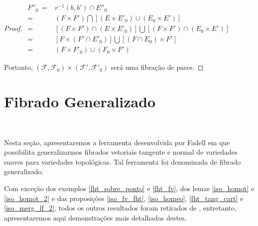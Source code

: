 \documentclass[12pt,oneside]{book} %
\begin{document}
\begin{proof}
	$\begin{array}{rl}
		F''_{0} \ = & r^{-1}(b,b')\cap E''_{0} \\
		= & (F\times F')\bigcap [(E\times E'_{0})\cup (E_{0}\times E')] \\
		= & [(F\times F')\cap (E\times E'_{0})]\bigcup [(F\times F')\cap (E_{0}\times E')] \\
		= & [F\times (F'\cap E'_{0})]\bigcup [(F\cap E_{0})\times F'] \\
		= & (F\times F'_{0})\cup (F_{0}\times F')
	\end{array}$ \newline
	
	\par Portanto, $(\mathcal{F},\mathcal{F}_{0})\times (\mathcal{F'},\mathcal{F'}_{0})$ será uma fibração de pares.
	
\end{proof}






\section{Fibrado Generalizado}\label{secao_fib_gener}

\

\par Nesta seção, apresentaremos a ferramenta desenvolvida por Fadell em \cite{fadell_1} que possibilita generalizarmos fibrados vetoriais tangente e normal de variedades suaves para variedades topológicas. Tal ferramenta foi denominada de fibrado generalizado.

\par Com exceção dos exemplos \ref{fht_sobre_ponto} e \ref{fht_fv}, dos lemas \ref{iso_homot} e \ref{iso_homot_2} e das proposições \ref{iso_fv_fht}, \ref{iso_homeo}, \ref{fht_tang_cart} e \ref{iso_merg_lf_2}, todos os outros resultados foram retirados de \cite{fadell_1}, entretanto, apresentaremos aqui demonstrações mais detalhadas destes.
\end{document}
